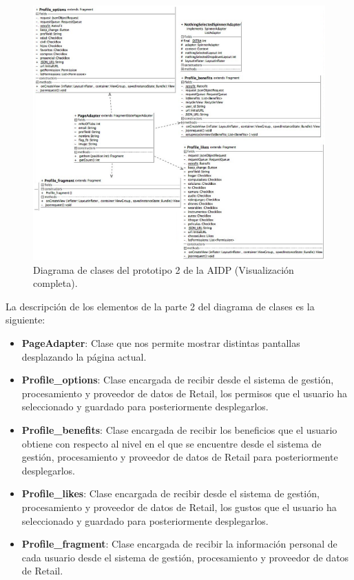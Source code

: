 \FloatBarrier
\begin{figure}[htbp!]
		\centering
			\includegraphics[width=1.1 \textwidth]{imagenes/aidp_clases/pageA}
		\caption{Diagrama de clases del prototipo 2 de la AIDP (Visualización completa).}
		\label{image:clases22}
\end{figure}
\FloatBarrier

La descripción de los elementos de la parte 2 del diagrama de clases es la siguiente: 
\begin{itemize}
\item \textbf{PageAdapter}: Clase que nos permite mostrar distintas pantallas desplazando la página actual.
\item \textbf{Profile\_options}: Clase encargada de recibir desde el sistema de gestión, procesamiento y proveedor de datos de Retail, los permisos que el usuario ha seleccionado y guardado para posteriormente desplegarlos.
\item \textbf{Profile\_benefits}: Clase encargada de recibir los beneficios que el usuario obtiene con respecto al nivel en el que se encuentre desde el sistema de gestión, procesamiento y proveedor de datos de Retail para posteriormente desplegarlos.
\item \textbf{Profile\_likes}: Clase encargada de recibir  desde el sistema de gestión, procesamiento y proveedor de datos de Retail, los gustos que el usuario ha seleccionado  y guardado para posteriormente desplegarlos.
\item \textbf{Profile\_fragment}: Clase encargada de recibir la información personal de cada usuario desde el sistema de gestión, procesamiento y proveedor de datos de Retail.
\end{itemize}

